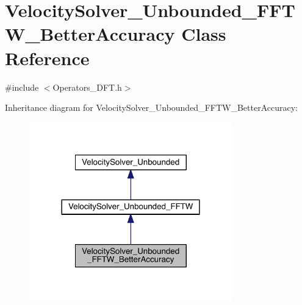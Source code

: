 \hypertarget{class_velocity_solver___unbounded___f_f_t_w___better_accuracy}{}\section{Velocity\+Solver\+\_\+\+Unbounded\+\_\+\+F\+F\+T\+W\+\_\+\+Better\+Accuracy Class Reference}
\label{class_velocity_solver___unbounded___f_f_t_w___better_accuracy}


{\ttfamily \#include $<$Operators\+\_\+\+D\+F\+T.\+h$>$}



Inheritance diagram for Velocity\+Solver\+\_\+\+Unbounded\+\_\+\+F\+F\+T\+W\+\_\+\+Better\+Accuracy\+:\nopagebreak
\begin{figure}[H]
\begin{center}
\leavevmode
\includegraphics[width=249pt]{d8/d65/class_velocity_solver___unbounded___f_f_t_w___better_accuracy__inherit__graph}
\end{center}
\end{figure}


